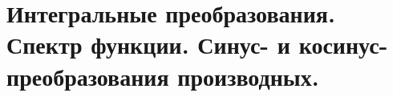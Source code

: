 \chapter{Интегральные преобразования. Спектр функции. Синус- и
косинус-преобразования производных.}

\newpage
